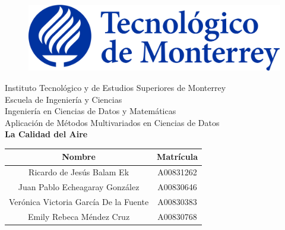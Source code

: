 \documentclass[10pt]{article}
\begin{document}
    \begin{titlepage}
        \begin{center}
            \begin{figure}
                \centering
                \includegraphics[scale=0.13]{img/logo_itesm.png}\\ %
            \end{figure}
            \vspace{5cm}
            \LARGE{Instituto Tecnológico y de Estudios Superiores de Monterrey}\\
            \vspace{1cm}
            \large Escuela de Ingeniería y Ciencias \\
            \vspace{0.2cm}
            \large Ingeniería en Ciencias de Datos y Matemáticas \\
            \vspace{0.2cm}
            \large Aplicación de Métodos Multivariados en Ciencias de Datos \\
            \vspace{1cm}
            \textbf{La Calidad del Aire}\\ %
            \vspace{0.7cm}
            \begin{table}[h!]
                \centering
                \begin{tabular}{ ||c|c|| }
                    \hline
                    Nombre & Matrícula \\
                    \hline
                    Ricardo de Jesús Balam Ek & A00831262 \\
                    \hline
                    Juan Pablo Echeagaray González & A00830646 \\
                    \hline
                    Verónica Victoria García De la Fuente & A00830383 \\
                    \hline
                    Emily Rebeca Méndez Cruz & A00830768 \\

\end{tabular}
\end{table}
\end{center}
\end{titlepage}
\end{document}
